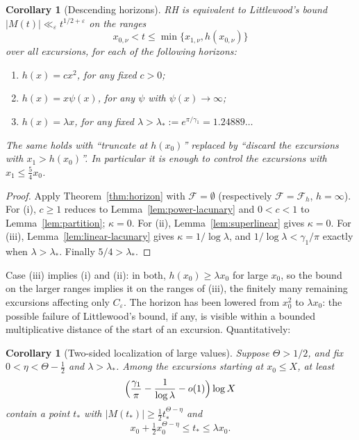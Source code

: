 \documentclass[11pt]{amsart}
\numberwithin{equation}{section}
\theoremstyle{plain}
\newtheorem{corollary}[theorem]{Corollary}
\theoremstyle{definition}
\theoremstyle{remark}
\newcommand{\eps}{\varepsilon}
\newcommand{\F}{\mathcal{F}}
\begin{document}
\begin{corollary}[Descending horizons]
\label{cor:descending}
\label{cor:linear-ordinary-RH}
RH is equivalent to Littlewood's bound
$|M(t)|\ll_\eps t^{1/2+\eps}$ on the ranges
\[
x_{0,\nu}<t\le\min\{x_{1,\nu},h(x_{0,\nu})\}
\]
over all excursions, for each of the following horizons:
\begin{enumerate}[label=\textup{(\roman*)}]
\item $h(x)=cx^2$, for any fixed $c>0$;
\item $h(x)=x\psi(x)$, for any $\psi$ with $\psi(x)\to\infty$;
\item $h(x)=\lambda x$, for any fixed $\lambda>\lambda_*:=e^{\pi/\gamma_1}=1.24889\ldots$
\end{enumerate}
The same holds with ``truncate at $h(x_0)$'' replaced by ``discard the
excursions with $x_1>h(x_0)$''. In particular it is enough to control the
excursions with $x_1\le\frac54x_0$.
\end{corollary}

\begin{proof}
Apply Theorem~\ref{thm:horizon} with $\F=\emptyset$ (respectively
$\F=\F_h$, $h=\infty$). For (i), $c\ge1$ reduces to
Lemma~\ref{lem:power-lacunary} and $0<c<1$ to Lemma~\ref{lem:partition};
$\kappa=0$. For (ii), Lemma~\ref{lem:superlinear} gives $\kappa=0$. For
(iii), Lemma~\ref{lem:linear-lacunary} gives $\kappa=1/\log\lambda$, and
$1/\log\lambda<\gamma_1/\pi$ exactly when $\lambda>\lambda_*$. Finally
$5/4>\lambda_*$.
\end{proof}

Case (iii) implies (i) and (ii): in both, $h(x_0)\ge\lambda x_0$ for large
$x_0$, so the bound on the larger ranges implies it on the ranges of (iii),
the finitely many remaining excursions affecting only $C_\eps$. The horizon has
been lowered from $x_0^2$ to $\lambda x_0$: the possible failure of
Littlewood's bound, if any, is visible within a bounded multiplicative
distance of the start of an excursion. Quantitatively:

\begin{corollary}[Two-sided localization of large values]
\label{cor:two-sided}
Suppose $\Theta>1/2$, and fix $0<\eta<\Theta-\frac12$ and $\lambda>\lambda_*$.
Among the excursions starting at $x_0\le X$, at least
\[
\Bigl(\frac{\gamma_1}{\pi}-\frac1{\log\lambda}-o(1)\Bigr)\log X
\]
contain a point $t_*$ with $|M(t_*)|\ge\frac12t_*^{\Theta-\eta}$ and
\[
x_0+\tfrac12x_0^{\Theta-\eta}\le t_*\le\lambda x_0 .
\]
\end{corollary}
\end{document}
